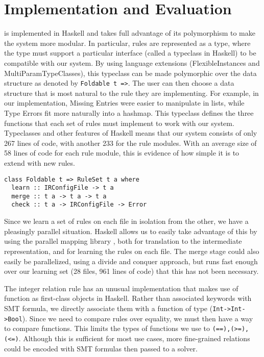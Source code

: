 \section{Implementation and Evaluation}

\app is implemented in Haskell and takes full advantage of its polymorphism to make the system more modular.
In particular, rules are represented as a type, where the type must support a particular interface (called a typeclass in Haskell) to be compatible with our system.
By using language extensions (FlexibleInstances and MultiParamTypeClasses), this typeclass can be made polymorphic over the data structure as denoted by \lstinline{Foldable t =>}.
The user can then choose a data structure that is most natural to the rule they are implementing.
For example, in our implementation, Missing Entries were easier to manipulate in lists, while Type Errors fit more naturally into a hashmap.
This typeclass defines the three functions that each set of rules must implement to work with our system.
Typeclasses and other features of Haskell means that our system consists of only 267 lines of code, with another 233 for the rule modules.
With an average size of 58 lines of code for each rule module, this is evidence of how simple it is to extend \app with new rules.

\begin{lstlisting}
class Foldable t => RuleSet t a where
  learn :: IRConfigFile -> t a
  merge :: t a -> t a -> t a
  check :: t a -> IRConfigFile -> Error
\end{lstlisting}

Since we learn a set of rules on each file in isolation from the other, we have a pleasingly parallel situation.
Haskell allows us to easily take advantage of this by using the parallel
mapping library \cite{parallel}, both for translation to the intermediate representation, and for learning the rules on each file.
The merge stage could also easily be parallelized, using a divide and conquer approach, but \app runs fast enough over our learning set (28 files, 961 lines of code) that this has not been necessary.

The integer relation rule has an unusual implementation that makes use of function as first-class objects in Haskell.
Rather than associated keywords with SMT formula, we directly associate them with a function of type (\lstinline{Int->Int->Bool}).
Since we need to compare rules over equality, we must then have a way to compare functions.
This limits the types of functions we use to \lstinline{(==),(>=),(<=)}.
Although this is sufficient for most use cases, more fine-grained relations could be encoded with SMT formulas then passed to a solver.


